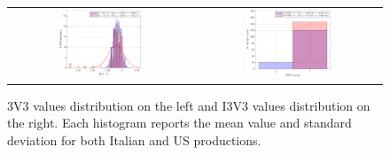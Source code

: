 \begin{figure}[ht]
    \centering
    \begin{tabular}{cc}
        \includegraphics[width=0.467\textwidth]{Images/chap2/results/3V3.pdf} & \includegraphics[width=0.477\textwidth]{Images/chap2/results/I3V3.pdf}\\
    \end{tabular}
    \caption{3V3 values distribution on the left and I3V3 values distribution on the right. Each histogram reports the mean value and standard deviation for both Italian and US productions.}
    \label{fig3V3I3V3}
\end{figure}

